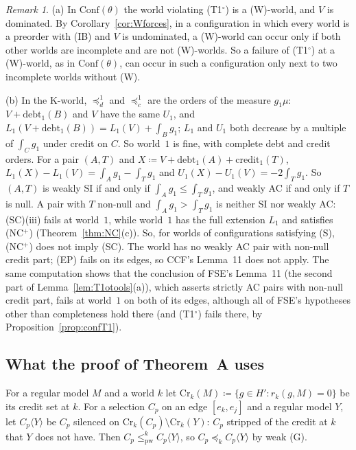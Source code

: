 \documentclass[11pt]{article}
\theoremstyle{definition}\newtheorem{definition}[theorem]{Definition}
\theoremstyle{remark}\newtheorem{remark}[theorem]{Remark}
\newcommand{\debt}{\mathrm{debt}}
\newcommand{\cred}{\mathrm{credit}}
\newcommand{\pw}{\mathrm{pw}}
\newcommand{\To}{\textup{(T1$^\circ$)}}
\begin{document}
\begin{remark}\label{rem:conf}
(a) In $\mathrm{Conf}(\theta)$ the world violating \To{} is a (W)-world, and
$V$ is dominated. By Corollary~\ref{cor:Wforces}, in a configuration in
which every world is a preorder with (IB) and $V$ is undominated, a
(W)-world can occur only if both other worlds are incomplete and are not
(W)-worlds. So a failure of \To{} at a (W)-world, as in
$\mathrm{Conf}(\theta)$, can occur in such a configuration only next to two
incomplete worlds without (W).

(b) In the K-world, $\preceq^1_d$ and $\preceq^1_c$ are the orders of the
measure $g_1\mu$: $V+\debt_1(B)$ and $V$ have the same $U_1$, and
$L_1(V+\debt_1(B))=L_1(V)+\int_Bg_1$; $L_1$ and $U_1$ both decrease by a
multiple of $\int_Cg_1$ under credit on $C$. So world~$1$ is fine, with
complete debt and credit orders. For a pair $(A,T)$ and
$X\coloneqq V+\debt_1(A)+\cred_1(T)$, $L_1(X)-L_1(V)=\int_Ag_1-\int_Tg_1$ and
$U_1(X)-U_1(V)=-2\int_Tg_1$. So $(A,T)$ is weakly SI if and only if
$\int_Ag_1\le\int_Tg_1$, and weakly AC if and only if $T$ is null. A pair
with $T$ non-null and $\int_Ag_1>\int_Tg_1$ is neither SI nor weakly AC:
(SC)(iii) fails at world~$1$, while world~$1$ has the full extension $L_1$
and satisfies (NC$^+$) (Theorem~\ref{thm:NC}(c)). So, for worlds of
configurations satisfying (S), (NC$^+$) does not imply (SC). The world has
no weakly AC pair with non-null credit part; (EP) fails on its edges, so
CCF's Lemma~11 does not apply. The same computation shows that the
conclusion of FSE's Lemma~11 (the second part of
Lemma~\ref{lem:T1otools}(a)), which asserts strictly AC pairs with non-null
credit part, fails at world~$1$ on both of its edges, although all of FSE's hypotheses
other than completeness hold there (and \To{} fails there, by
Proposition~\ref{prop:confT1}).
\end{remark}

\subsection{What the proof of Theorem~A uses}\label{sec:T1s}

For a regular model $M$ and a world $k$ let $\mathrm{Cr}_k(M)\coloneqq\{g\in
H':r_k(g,M)=0\}$ be its credit set at $k$. For a selection $C_p$ on an edge
$[e_k,e_j]$ and a regular model $Y$, let $C_p\langle Y\rangle$ be $C_p$
silenced on $\mathrm{Cr}_k(C_p)\setminus\mathrm{Cr}_k(Y)$: $C_p$ stripped of
the credit at $k$ that $Y$ does not have. Then $C_p\le^k_\pw C_p\langle
Y\rangle$, so $C_p\preceq_kC_p\langle Y\rangle$ by weak (G).
\end{document}
